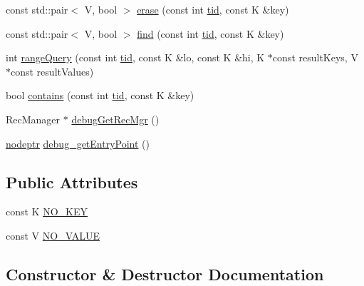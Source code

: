 \begin{DoxyCompactItemize}
\item 
const std\+::pair$<$ V, bool $>$ \hyperlink{classbst__glock__ns_1_1bst__glock_a1f5c007ceb36ceb008cf131c4abc4759}{erase} (const int \hyperlink{microbench_2main_8cpp_a9ca9869868fe7e7a38a921cc7de4103f}{tid}, const K \&key)
\item 
const std\+::pair$<$ V, bool $>$ \hyperlink{classbst__glock__ns_1_1bst__glock_a76d33315a4ed9843194d7e893f8eb09b}{find} (const int \hyperlink{microbench_2main_8cpp_a9ca9869868fe7e7a38a921cc7de4103f}{tid}, const K \&key)
\item 
int \hyperlink{classbst__glock__ns_1_1bst__glock_a1da5b0856cbf065c8fc1f29154a24bfc}{range\+Query} (const int \hyperlink{microbench_2main_8cpp_a9ca9869868fe7e7a38a921cc7de4103f}{tid}, const K \&lo, const K \&hi, K $\ast$const result\+Keys, V $\ast$const result\+Values)
\item 
bool \hyperlink{classbst__glock__ns_1_1bst__glock_a269c46f77c8f6a336291082ed1a238a8}{contains} (const int \hyperlink{microbench_2main_8cpp_a9ca9869868fe7e7a38a921cc7de4103f}{tid}, const K \&key)
\item 
Rec\+Manager $\ast$ \hyperlink{classbst__glock__ns_1_1bst__glock_a7d4cc1614d6bfd96a4708ce0e1fa8cc8}{debug\+Get\+Rec\+Mgr} ()
\item 
\hyperlink{bst__rwlock__impl_8h_a04158d2a20768fe447133ff555823b05}{nodeptr} \hyperlink{classbst__glock__ns_1_1bst__glock_aca7d5081582066674f6a4cc78d2e7f68}{debug\+\_\+get\+Entry\+Point} ()
\end{DoxyCompactItemize}
\subsection*{Public Attributes}
\begin{DoxyCompactItemize}
\item 
const K \hyperlink{classbst__glock__ns_1_1bst__glock_affb054654adf46e2ef8800cdd533f4fa}{N\+O\+\_\+\+K\+EY}
\item 
const V \hyperlink{classbst__glock__ns_1_1bst__glock_a6c0b0267a6c9ea854306e22c7f65bc53}{N\+O\+\_\+\+V\+A\+L\+UE}
\end{DoxyCompactItemize}


\subsection{Constructor \& Destructor Documentation}
\mbox{\label{classbst__glock__ns_1_1bst__glock_aa69faa0593101e2c584888c2bd3d20d1}} 
